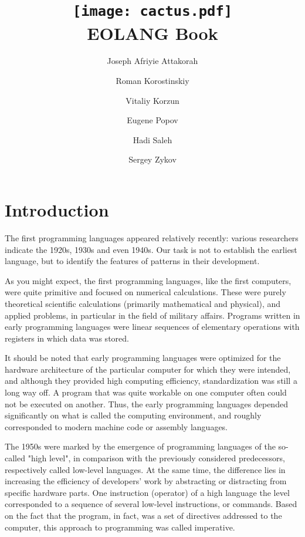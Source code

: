 \documentclass[12pt]{book}
\title{\texttt{[image: cactus.pdf]} \\[1in] EOLANG Book}
\author{Joseph Afriyie Attakorah \and
  Roman Korostinskiy \and
  Vitaliy Korzun \and
  Eugene Popov \and
  Hadi Saleh \and
  Sergey Zykov}
\begin{document}
\raggedbottom

\maketitle

\tableofcontents

\chapter{Introduction}
The  first programming languages appeared relatively recently: various researchers indicate the 1920s, 1930s and even 1940s. Our task is not to establish the earliest language, but to identify the features of patterns in their development.

As you might expect, the first programming languages, like the first computers, were quite primitive and focused on numerical calculations. These were purely theoretical scientific calculations (primarily mathematical and physical), and applied problems, in particular in the field of military affairs. Programs written in early programming languages were linear sequences of elementary operations with registers in which data was stored.

It should be noted that early programming languages were optimized for the hardware architecture of the particular computer for which they were intended, and  although they provided high computing efficiency, standardization was still a long way off. A program that was quite workable on one computer often could not be executed on another. Thus, the early programming languages depended significantly on what is called the computing environment, and roughly corresponded to modern machine code or assembly languages.

The 1950s were marked by the emergence of programming languages of the so-called "high level", in comparison with the previously considered predecessors, respectively called low-level languages. At the same time, the difference lies in increasing the efficiency of developers' work by abstracting or distracting from specific hardware parts. One instruction (operator) of a high language the level corresponded to a sequence of several low-level instructions, or commands. Based on the fact that the program, in fact, was a set of directives addressed to the computer, this approach to programming was called imperative.
\end{document}
